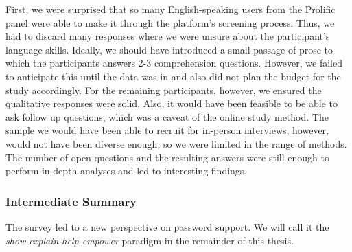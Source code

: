 First, we were surprised that so many English-speaking users from the Prolific panel were able to make it through the platform's screening process. Thus, we had to discard many responses where we were unsure about the participant's language skills. Ideally, we should have introduced a small passage of prose to which the participants answers 2-3 comprehension questions. However, we failed to anticipate this until the data was in and also did not plan the budget for the study accordingly. For the remaining participants, however, we ensured the qualitative responses were solid. 
Also, it would have been feasible to be able to ask follow up questions, which was a caveat of the online study method. The sample we would have been able to recruit for in-person interviews, however, would not have been diverse enough, so we were limited in the range of methods. The number of open questions and the resulting answers were still enough to perform in-depth analyses and led to interesting findings. %

\subsubsection{Intermediate Summary}
The survey led to a new perspective on password support. We will call it the \textit{show-explain-help-empower} paradigm in the remainder of this thesis. 


%
